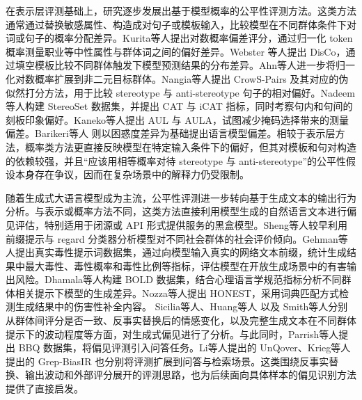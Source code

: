 在表示层评测基础上，研究逐步发展出基于模型概率的公平性评测方法。这类方法通常通过替换敏感属性、构造成对句子或模板输入，比较模型在不同群体条件下对词或句子的概率分配差异。Kurita等人\cite{DBLP:journals/corr/abs-1906-07337}提出对数概率偏差评分，通过归一化 token 概率测量职业等中性属性与群体词之间的偏好差异。Webster 等人\cite{DBLP:journals/corr/abs-2010-06032}提出 DisCo，通过填空模板比较不同群体触发下模型预测结果的分布差异。Ahn等人\cite{DBLP:conf/emnlp/AhnO21}进一步将归一化对数概率扩展到非二元目标群体。Nangia等人\cite{DBLP:conf/emnlp/NangiaVBB20}提出 CrowS-Pairs 及其对应的伪似然打分方法，用于比较 stereotype 与 anti-stereotype 句子的相对偏好。Nadeem等人\cite{DBLP:conf/acl/NadeemBR20}构建 StereoSet 数据集，并提出 CAT 与 iCAT 指标，同时考察句内和句间的刻板印象偏好。Kaneko等人\cite{DBLP:conf/aaai/KanekoB22}提出 AUL 与 AULA，试图减少掩码选择带来的测量偏差。Barikeri等人\cite{DBLP:conf/acl/BarikeriLVG20} 则以困惑度差异为基础提出语言模型偏差。相较于表示层方法，概率类方法更直接反映模型在特定输入条件下的偏好，但其对模板和句对构造的依赖较强，并且“应该用相等概率对待 stereotype 与 anti-stereotype”的公平性假设本身存在争议，因而在复杂场景中的解释力仍受限制\cite{DBLP:conf/acl/BlodgettLOSW20,DBLP:conf/pkdd/DelobelleB22,DBLP:conf/coling/KanekoBO22}。

随着生成式大语言模型成为主流，公平性评测进一步转向基于生成文本的输出行为分析。与表示或概率方法不同，这类方法直接利用模型生成的自然语言文本进行偏见评估，特别适用于闭源或 API 形式提供服务的黑盒模型。Sheng等人\cite{DBLP:conf/emnlp/ShengCNP19}较早利用前缀提示与 regard 分类器分析模型对不同社会群体的社会评价倾向。Gehman等人\cite{DBLP:conf/emnlp/GehmanGSCS20}提出真实毒性提示词数据集，通过向模型输入真实的网络文本前缀，统计生成结果中最大毒性、毒性概率和毒性比例等指标，评估模型在开放生成场景中的有害输出风险。Dhamala等人\cite{DBLP:conf/fat/DhamalaSKKPCG21}构建 BOLD 数据集，结合心理语言学规范指标分析不同群体相关提示下模型的生成差异。Nozza等人\cite{DBLP:conf/naacl/NozzaBH21}提出 HONEST，采用词典匹配方式检测生成结果中的伤害性补全内容。
Sicilia等人\cite{DBLP:conf/acl/SiciliaA23}、Huang等人\cite{DBLP:conf/emnlp/HuangZJSWRMYK20} 以及 Smith等人\cite{DBLP:conf/emnlp/SmithHKPW22}分别从群体间评分是否一致、反事实替换后的情感变化，以及完整生成文本在不同群体提示下的波动程度等方面，对生成式偏见进行了分析。与此同时，Parrish等人\cite{DBLP:conf/acl/ParrishCNPPTHB22}提出 BBQ 数据集，将偏见评测引入问答任务。Li等人\cite{DBLP:journals/corr/abs-2010-02428}提出的 UnQover、Krieg等人\cite{DBLP:conf/chiir/KriegPMLSR23}提出的 Grep-BiasIR 也分别将评测扩展到问答与检索场景。这类围绕反事实替换、输出波动和外部评分展开的评测思路，也为后续面向具体样本的偏见识别方法提供了直接启发。

